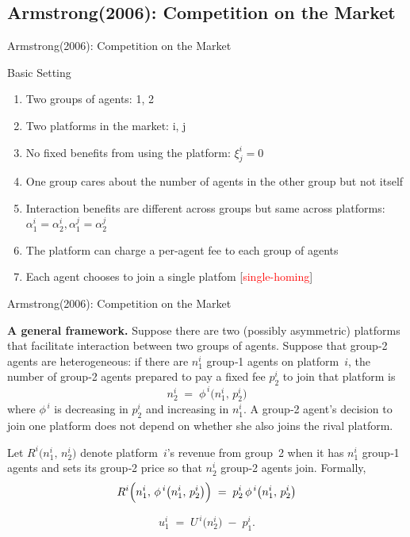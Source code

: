 \documentclass[aspectratio=169]{beamer}  %
\begin{document}
\subsection{Armstrong(2006): Competition on the Market}
\begin{frame}{Armstrong(2006): Competition on the Market}
    \begin{block}{Basic Setting}
        \begin{enumerate}
            \item Two groups of agents: 1, 2
            \item Two platforms in the market: i, j
            \item No fixed benefits from using the platform: $\xi_{j}^{i} = 0$
            \item One group cares about the number of agents in the other group but not itself
            \item Interaction benefits are different across groups but same across platforms: $\alpha_{1}^{i} = \alpha_{2}^{i}, \alpha_{1}^{j} = \alpha_{2}^{j}$
            \item The platform can charge a per-agent fee to each group of agents
            \item Each agent chooses to join a single platfom [\textcolor{red}{single-homing}]
        \end{enumerate}
    \end{block}
\end{frame}

\begin{frame}{Armstrong(2006): Competition on the Market}
    \justifying  %

    \textbf{A general framework.} Suppose there are two (possibly asymmetric) platforms 
    that facilitate interaction between two groups of agents.  Suppose that group‐2 
    agents are heterogeneous: if there are \(n_{1}^{i}\) group‐1 agents on platform~\(i\), 
    the number of group‐2 agents prepared to pay a fixed fee \(p_{2}^{i}\) to join that 
    platform is
    \[
       n_{2}^{i} 
       \;=\; 
       \phi^{\,i}\bigl(n_{1}^{i},\,p_{2}^{i}\bigr)
    \]
    where \(\phi^{\,i}\) is decreasing in \(p_{2}^{i}\) and increasing in \(n_{1}^{i}\). 
    A group‐2 agent’s decision to join one platform does not depend on whether she also 
    joins the rival platform.
    
    \medskip
    
    Let \(R^{i}\bigl(n_{1}^{i},\,n_{2}^{i}\bigr)\) denote platform~\(i\)’s revenue from 
    group~2 when it has \(n_{1}^{i}\) group‐1 agents and sets its group‐2 price so that 
    \(n_{2}^{i}\) group‐2 agents join. Formally,
    \[
       R^{i}\Bigl(n_{1}^{i},\,\phi^{\,i}\bigl(n_{1}^{i},\,p_{2}^{i}\bigr)\Bigr)
       \;=\;
       p_{2}^{i}\,\phi^{\,i}\bigl(n_{1}^{i},\,p_{2}^{i}\bigr)
    \]
    
    \[
       u_{1}^{i}
       \;=\;
       U^{\,i}\bigl(n_{2}^{i}\bigr)
       \;-\;
       p_{1}^{i}.
    \]
\end{frame}
\end{document}
